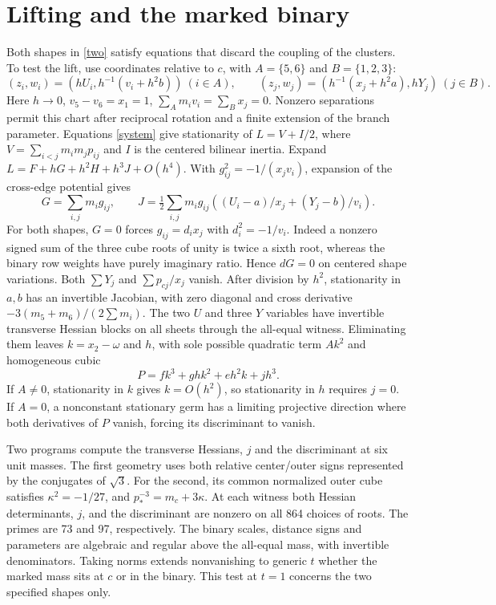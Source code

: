 \documentclass[11pt]{article}
\begin{document}
\section{Lifting and the marked binary}
Both shapes in \eqref{two} satisfy equations that discard the coupling of the clusters. To test the lift, use coordinates relative to $c$, with $A=\{5,6\}$ and $B=\{1,2,3\}$:
\[
 (z_i,w_i)=(hU_i,h^{-1}(v_i+h^2b))\ (i\in A),\qquad
 (z_j,w_j)=(h^{-1}(x_j+h^2a),hY_j)\ (j\in B).
\]
Here $h\to0$, $v_5-v_6=x_1=1$, $\sum_A m_i v_i=\sum_Bx_j=0$. Nonzero separations permit this chart after reciprocal rotation and a finite extension of the branch parameter. Equations \eqref{system} give stationarity of $L=V+I/2$, where $V=\sum_{i<j}m_im_jp_{ij}$ and $I$ is the centered bilinear inertia. Expand $L=F+hG+h^2H+h^3J+O(h^4)$. With $g_{ij}^2=-1/(x_jv_i)$, expansion of the cross-edge potential gives
\[
 G=\sum_{i,j}m_i g_{ij},\qquad J=\tfrac12\sum_{i,j}m_i g_{ij}
 \left((U_i-a)/x_j+(Y_j-b)/v_i\right).
\]
For both shapes, $G=0$ forces $g_{ij}=d_i x_j$ with $d_i^2=-1/v_i$. Indeed a nonzero signed sum of the three cube roots of unity is twice a sixth root, whereas the binary row weights have purely imaginary ratio. Hence $dG=0$ on centered shape variations. Both $\sum Y_j$ and $\sum p_{cj}/x_j$ vanish. After division by $h^2$, stationarity in $a,b$ has an invertible Jacobian, with zero diagonal and cross derivative $-3(m_5+m_6)/(2\sum m_i)$. The two $U$ and three $Y$ variables have invertible transverse Hessian blocks on all sheets through the all-equal witness. Eliminating them leaves $k=x_2-\omega$ and $h$, with sole possible quadratic term $Ak^2$ and homogeneous cubic
\[
 P=f k^3+g h k^2+e h^2k+jh^3 .
\]
If $A\ne0$, stationarity in $k$ gives $k=O(h^2)$, so stationarity in $h$ requires $j=0$. If $A=0$, a nonconstant stationary germ has a limiting projective direction where both derivatives of $P$ vanish, forcing its discriminant to vanish.

Two programs compute the transverse Hessians, $j$ and the discriminant at six unit masses. The first geometry uses both relative center/outer signs represented by the conjugates of $\sqrt3$. For the second, its common normalized outer cube satisfies $\kappa^2=-1/27$, and $p_*^{-3}=m_c+3\kappa$. At each witness both Hessian determinants, $j$, and the discriminant are nonzero on all 864 choices of roots. The primes are 73 and 97, respectively. The binary scales, distance signs and parameters are algebraic and regular above the all-equal mass, with invertible denominators. Taking norms extends nonvanishing to generic $t$ whether the marked mass sits at $c$ or in the binary. This test at $t=1$ concerns the two specified shapes only.
\end{document}
